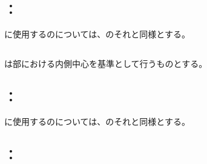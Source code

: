 \subsection{\indexTCOutcutMilling\nameToolCorrection：\EndFaceBoringMilling}
\EndFaceBoringMilling に使用する\indexTCSquareEndMill\nameSquareEndMill の\ToolCorrection については、\OutcutMilling のそれと同様とする。



\subsection{\IncutBoringMillingReferencePoint}
\IncutBoringMillingReferencePoint は\TopEndFace 部における内側中心を基準として行うものとする。


\subsection{\indexTCOutcutMilling\nameToolCorrection：\IncutBoringMilling}
\IncutBoringMilling に使用する\indexTCSquareEndMill\nameSquareEndMill の\ToolCorrection については、\OutcutMilling のそれと同様とする。


\clearpage


\subsection{\indexTCDimpleMilling\nameToolCorrection：\nameDimpleMilling}

